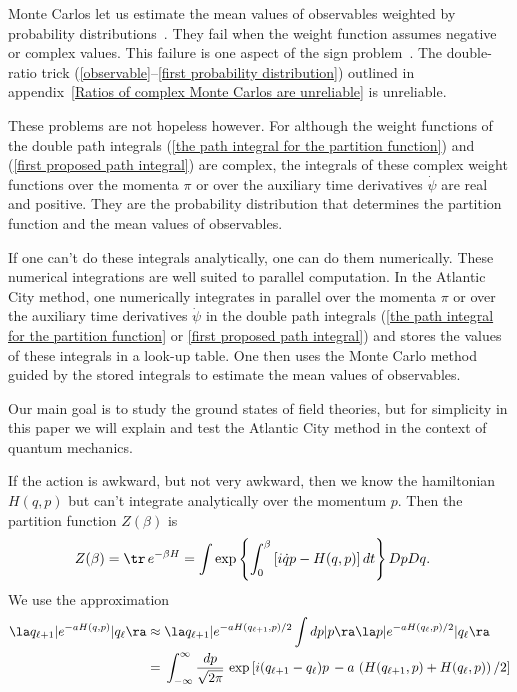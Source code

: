 \documentclass[prd,preprint,floatfix,showpacs]{revtex4-1}
\begin{document}
Monte Carlos let us estimate the mean values
of observables weighted by probability 
distributions~\cite{CahillXIV}.
They fail when the weight function assumes
negative or complex values.
This failure is one aspect of the sign 
problem~\cite{Behtash:2015loa, *Scorzato:2015qts, *Gattringer:2016kco}\@.
The double-ratio 
trick (\ref{observable}--\ref{first probability distribution})
outlined in 
appendix~\ref {Ratios of complex Monte Carlos are unreliable}
is unreliable.
\par
These problems are not hopeless however.
For although the weight functions 
of the double path integrals
(\ref{the path integral for the partition function}) and 
(\ref {first proposed path integral})
are complex,
the integrals of these 
complex weight functions over 
the momenta \( \pi \) or over 
the auxiliary time derivatives \( \dot \psi \)
are real and positive.
They are the probability distribution
that determines the partition function
and the mean values of observables.
\par
If one can't do these
integrals analytically,
one can do them numerically.
These numerical integrations
are well suited to parallel computation.
In the Atlantic City method,
one numerically integrates in parallel over 
the momenta \( \pi \) or over 
the auxiliary time derivatives \( \dot \psi \)
in the double path integrals
(\ref{the path integral for the partition function} or 
\ref {first proposed path integral}) 
and stores the values
of these integrals in a look-up table.
One then uses the Monte Carlo
method guided by the
stored integrals 
to estimate the mean values of observables.
\par
Our main goal is
to study the ground states
of field theories, but 
for simplicity in this paper
we will explain and test 
the Atlantic City method in the context 
of quantum mechanics.
\par
If the action is awkward,
but not very awkward,  
then we know the hamiltonian
\( H(q,p) \) but can't integrate analytically
over the momentum \( p \)\@.
Then the partition function \( Z(\beta) \) is
\begin{equation} 
   \begin{split}
 Z(\beta) ={}& \tr \, e^{-\beta H} 
=  \int \exp\left\{ \int_0^\beta \left[ i \dot q p - H(q,p) \right] dt \right\}
Dp Dq .
 \label {The partition function then is}
    \end{split}
\end{equation}
We use the approximation
\begin{equation}
\begin{split}
\la q_{\ell+1} | e^{-a H(q, p)} | q_\ell \ra
\approx {}& 
\la q_{\ell+1} | e^{-a H(q_{\ell+1}, p)/2} 
\int dp |p\ra \la p |  e^{-a H(q_\ell, p)/2} | q_\ell \ra
\\
= {}& 
\int_{-\infty}^\infty \frac{dp}{\sqrt{2\pi}} \,
\exp \left[i (q_{\ell+1} - q_\ell) p \, 
- a \, \left( H(q_{\ell+1}, p) + H(q_\ell, p) \right)/2\right] 
\label {using the approximation}
\end{split}
\end{equation}
\end{document}
